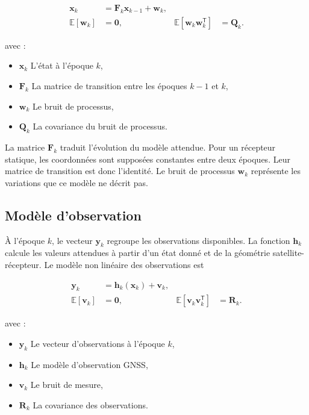 \begin{align}
\mathbf x_k
&=
\mathbf F_k\mathbf x_{k-1}+\mathbf w_k,
\\
\mathbb E[\mathbf w_k]
&=\mathbf0,
&
\mathbb E[\mathbf w_k\mathbf w_k^{\mathsf T}]
&=\mathbf Q_k.
\label{ann:eq:kalman_prediction}
\end{align}

avec :

\begin{itemize}
    \item $\mathbf x_k$ L'état à l'époque $k$,
    \item $\mathbf F_k$ La matrice de transition entre les époques $k-1$ et
    $k$,
    \item $\mathbf w_k$ Le bruit de processus,
    \item $\mathbf Q_k$ La covariance du bruit de processus.
\end{itemize}

La matrice $\mathbf F_k$ traduit l'évolution du modèle attendue. Pour un
récepteur statique, les coordonnées sont supposées constantes entre deux
époques. Leur matrice de transition est donc l'identité. Le bruit de processus
$\mathbf w_k$ représente les variations que ce modèle ne décrit pas.
\subsection{Modèle d'observation}

À l'époque $k$, le vecteur $\mathbf y_k$ regroupe les observations disponibles.
La fonction $\mathbf h_k$ calcule les valeurs attendues à partir d'un état
donné et de la géométrie satellite-récepteur. Le modèle non linéaire des
observations est

\begin{align}
\mathbf y_k
&=
\mathbf h_k(\mathbf x_k)+\mathbf v_k,
\\
\mathbb E[\mathbf v_k]
&=\mathbf0,
&
\mathbb E[\mathbf v_k\mathbf v_k^{\mathsf T}]
&=\mathbf R_k.
\label{ann:eq:kalman_observation}
\end{align}

avec :

\begin{itemize}
    \item $\mathbf y_k$ Le vecteur d'observations à l'époque $k$,
    \item $\mathbf h_k$ Le modèle d'observation GNSS,
    \item $\mathbf v_k$ Le bruit de mesure,
    \item $\mathbf R_k$ La covariance des observations.
\end{itemize}

